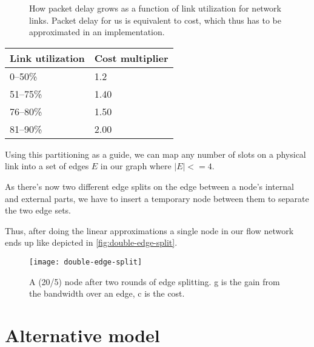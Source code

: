 \begin{figure}
    \centering
    \caption{How packet delay grows as a function of link utilization for network links. Packet delay for us is equivalent to cost, which thus has to be approximated in an implementation.}
    \label{fig:utility-latency}
\end{figure}


\begin{center}
    \label{tab:utilization-to-cost}
    \begin{tabular}{| l | l |}
    \hline
    \textbf{Link utilization} & \textbf{Cost multiplier} \\ \hline
    0--50\% & 1.2 \\ \hline
    51--75\% & 1.40 \\ \hline
    76--80\% & 1.50 \\ \hline
    81--90\% & 2.00 \\ \hline
    \end{tabular}
\end{center}

Using this partitioning as a guide, we can map any number of slots on a physical link into a set of edges $E$ in our graph where $|E| <= 4$.

As there's now two different edge splits on the edge between a node's internal and external parts, we have to insert a temporary node between them to separate the two edge sets.

Thus, after doing the linear approximations a single node in our flow network ends up like depicted in \autoref{fig:double-edge-split}.

\begin{figure}
    \centering
    \texttt{[image: double-edge-split]}
    \caption{A (20/5) node after two rounds of edge splitting. g is the gain from the bandwidth over an edge, c is the cost.}
    \label{fig:double-edge-split}
\end{figure}


\section{Alternative model}\label{sec:alternative-model}

